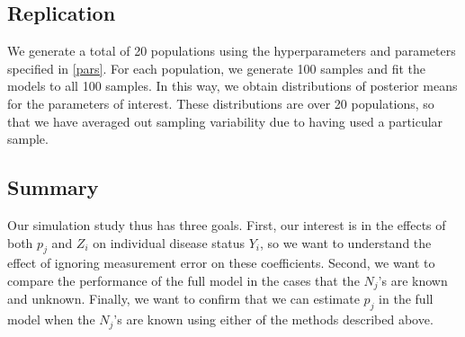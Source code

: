 \documentclass[10pt,a4paper]{article}
\begin{document}
\subsection*{Replication}
We generate a total of 20 populations using the hyperparameters and parameters specified in \ref{pars}. For each population, we generate 100 samples and fit the models to all 100 samples. In this way, we obtain distributions of posterior means for the parameters of interest. These distributions are over 20 populations, so that we have averaged out sampling variability due to having used a particular sample.

\subsection*{Summary}
Our simulation study thus has three goals. First, our interest is in the effects of both $p_j$ and $Z_i$ on individual disease status $Y_i$, so we want to understand the effect of ignoring measurement error on these coefficients. Second, we want to compare the performance of the full model in the cases that the $N_j$'s are known and unknown. Finally, we want to confirm that we can estimate $p_j$ in the full model when the $N_j$'s are known using either of the methods described above.




\end{document}
